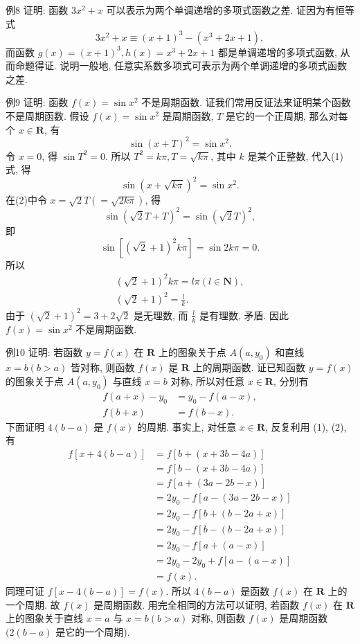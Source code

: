 例8 证明: 函数 $3 x^2+x$ 可以表示为两个单调递增的多项式函数之差.
证因为有恒等式
$$
3 x^2+x \equiv(x+1)^3-\left(x^3+2 x+1\right),
$$
而函数 $g(x)=(x+1)^3, h(x)=x^3+2 x+1$ 都是单调递增的多项式函数, 从而命题得证.
说明一般地, 任意实系数多项式可表示为两个单调递增的多项式函数之差.



例9 证明: 函数 $f(x)=\sin x^2$ 不是周期函数.
证我们常用反证法来证明某个函数不是周期函数.
假设 $f(x)=\sin x^2$ 是周期函数, $T$ 是它的一个正周期, 那么对每个 $x \in \mathbf{R}$, 有
$$
\sin (x+T)^2=\sin x^2 .
$$
令 $x=0$, 得 $\sin T^2=0$. 所以 $T^2=k \pi, T=\sqrt{k \pi}$, 其中 $k$ 是某个正整数, 代入(1)式, 得
$$
\sin (x+\sqrt{k \pi})^2=\sin x^2 .
$$
在(2)中令 $x=\sqrt{2} T(=\sqrt{2 k \pi})$, 得
$$
\sin (\sqrt{2} T+T)^2=\sin (\sqrt{2} T)^2,
$$
即
$$
\sin \left[(\sqrt{2}+1)^2 k \pi\right]=\sin 2 k \pi=0 .
$$
所以
$$
\begin{gathered}
(\sqrt{2}+1)^2 k \pi=l \pi(l \in \mathbf{N}), \\
(\sqrt{2}+1)^2=\frac{l}{k} .
\end{gathered}
$$
由于 $(\sqrt{2}+1)^2=3+2 \sqrt{2}$ 是无理数, 而 $\frac{l}{k}$ 是有理数, 矛盾.
因此 $f(x)=\sin x^2$ 不是周期函数.



例10 证明: 若函数 $y=f(x)$ 在 $\mathbf{R}$ 上的图象关于点 $A\left(a, y_0\right)$ 和直线 $x=b(b>a)$ 皆对称, 则函数 $f(x)$ 是 $\mathbf{R}$ 上的周期函数.
证已知函数 $y=f(x)$ 的图象关于点 $A\left(a, y_0\right)$ 与直线 $x=b$ 对称, 所以对任意 $x \in \mathbf{R}$, 分别有
$$
\begin{aligned}
f(a+x)-y_0 & =y_0-f(a-x), \\
f(b+x) & =f(b-x) .
\end{aligned}
$$
下面证明 $4(b-a)$ 是 $f(x)$ 的周期.
事实上, 对任意 $x \in \mathbf{R}$, 反复利用 (1), (2), 有
$$
\begin{aligned}
f[x+4(b-a)] & =f[b+(x+3 b-4 a)] \\
& =f[b-(x+3 b-4 a)] \\
& =f[a+(3 a-2 b-x)] \\
& =2 y_0-f[a-(3 a-2 b-x)] \\
& =2 y_0-f[b+(b-2 a+x)] \\
& =2 y_0-f[b-(b-2 a+x)] \\
& =2 y_0-f[a+(a-x)] \\
& =2 y_0-2 y_0+f[a-(a-x)] \\
& =f(x) .
\end{aligned}
$$
同理可证 $f[x-4(b-a)]=f(x)$.
所以 $4(b-a)$ 是函数 $f(x)$ 在 $\mathbf{R}$ 上的一个周期.
故 $f(x)$ 是周期函数.
用完全相同的方法可以证明, 若函数 $f(x)$ 在 $\mathbf{R}$ 上的图象关于直线 $x=a$ 与 $x=b(b>a)$ 对称, 则函数 $f(x)$ 是周期函数 $(2(b-a)$ 是它的一个周期).



